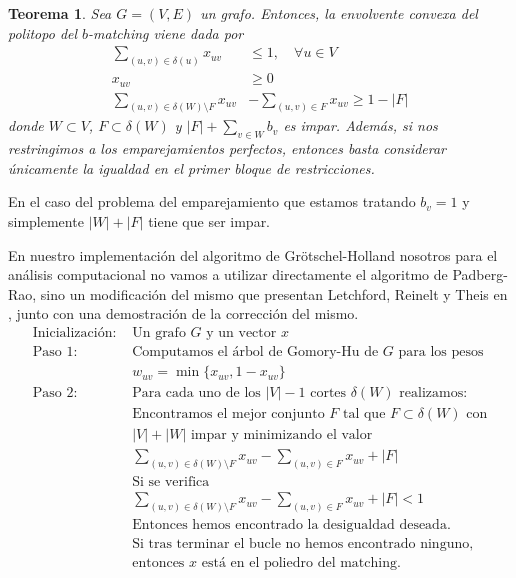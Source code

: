 \documentclass[twoside,a4paper,openright,12pt,tikz]{book}
\newtheorem{thm}{Teorema}[section]
\begin{document}
\begin{thm}
Sea $G=(V,E)$ un grafo. Entonces, la envolvente convexa del politopo del $b$-matching viene dada por
\begin{align*}
\sum_{(u,v)\in\delta(u)} x_{uv} &\leq 1, \quad \forall u\in V\\
x_{uv} &\geq 0\\
\sum_{(u,v)\in \delta(W)\setminus F}x_{uv}& - \sum_{(u,v)\in F}x_{uv} \geq 1 - |F|
\end{align*}
donde $W\subset V$, $F \subset \delta(W)$ y $|F| + \sum_{v \in W} b_v$ es impar. Además, si nos restringimos a los emparejamientos perfectos, entonces basta considerar únicamente la igualdad en el primer bloque de restricciones.
\end{thm}
En el caso del problema del emparejamiento que estamos tratando $b_v = 1$ y simplemente $|W|+|F|$ tiene que ser impar. 

En nuestro implementación del algoritmo de Grötschel-Holland nosotros para el análisis computacional no vamos a utilizar directamente el algoritmo de Padberg-Rao, sino un modificación del mismo que presentan Letchford, Reinelt y Theis en \cite{adam}, junto con una demostración de la corrección del mismo.
\begin{align*}
\text{Inicialización: }&\text{Un grafo $G$ y un vector $x$}\\
\text{Paso 1: }&\text{Computamos el árbol de Gomory-Hu de $G$ para los pesos}\\
& w_{uv} = \min\{x_{uv},1-x_{uv}\}\\
\text{Paso 2: }&\text{Para cada uno de los $|V|-1$ cortes $\delta(W)$ realizamos:}\\
&\text{Encontramos el mejor conjunto $F$ tal que $F\subset \delta(W)$ con}\\
&\text{$|V|+|W|$ impar y minimizando el valor}\\
&\sum_{(u,v)\in \delta(W)\setminus F}x_{uv} - \sum_{(u,v)\in F}x_{uv} + |F|\\
&\text{Si se verifica}\\
&\sum_{(u,v)\in \delta(W)\setminus F}x_{uv} - \sum_{(u,v)\in F}x_{uv} +|F|<1\\
& \text{Entonces hemos encontrado la desigualdad deseada.}\\
&\text{Si tras terminar el bucle no hemos encontrado ninguno,}\\
&\text{entonces $x$ está en el poliedro del matching.}\\
\end{align*}
\end{document}
